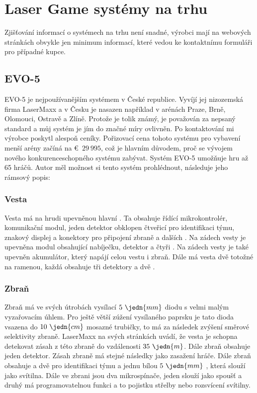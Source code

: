 \section{Laser Game systémy na trhu}
Zjišťování informací o systémech na trhu není snadné, výrobci mají na webových stránkách obvykle jen minimum informací, které vedou ke kontaktnímu formuláři pro případné kupce.

\subsection{EVO-5}

EVO-5 je nejpoužívanějším  systémem v České republice. Vyvíjí jej nizozemská firma LaserMaxx a v Česku je nasazen například v arénách Praze, Brně, Olomouci, Ostravě a Zlíně. Protože je tolik známý, je považován za nepsaný standard a můj systém je jím do značné míry ovlivněn. Po kontaktování mi výrobce poskytl alespoň ceníky. Pořizovací cena tohoto systému pro vybavení menší arény začíná na €~$29~995$, což je hlavním důvodem, proč se vývojem nového konkurenceschopného systému zabývat. Systém EVO-5 umožňuje hru až 65 hráčů. Autor měl možnost si tento systém prohlédnout, následuje jeho rámsový popis:

\subsubsection{Vesta}
Vesta má na hrudi upevněnou hlavní . Ta obsahuje řídící mikrokontrolér, komunikační  modul, jeden  detektor obklopen čtveřicí   pro identifikaci týmu, znakový displej a konektory pro připojení zbraně a dalších . Na zádech vesty je upevněna modul obsahující nabíječku,  detektor a čtyři  . Na zádech vesty je také upevněn akumulátor, který napájí celou vestu i zbraň. Dále má vesta dvě totožné  na ramenou, každá obsahuje tři  detektory a dvě  .

\subsubsection{Zbraň}
Zbraň má ve svých útrobách vysílací $5~\jedn{mm}$   diodu s velmi malým vyzařovacím úhlem. Pro ještě větší zúžení vysílaného paprsku je tato dioda vsazena do $10~\jedn{cm}$ mosazné trubičky, to má za následek zvýšení směrové selektivity zbraně. LaserMaxx na svých stránkách uvádí, že vesta je schopna detekovat zásah z této zbraně do vzdálenosti $35~\jedn{m}$. Dále zbraň obsahuje jeden  detektor. Zásah zbraně má stejné následky jako zasažení hráče. Dále zbraň obsahuje a dvě   pro identifikaci týmu a jednu bílou $5~\jedn{mm}$ , která slouží jako svítilna. Dále ve zbrani jsou dva mikrospínače, jeden slouží jako spoušť a druhý má programovatelnou funkci a to pojistku střelby nebo rozsvícení svítilny.

